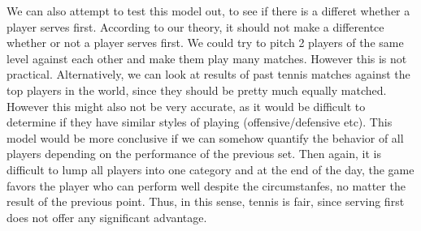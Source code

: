 \documentclass[12pt]{article}
\begin{document}
\vskip0.25in We can also attempt to test this model out, to see if there is a differet whether a player serves first. According to our theory, it should not make a differentce whether or not a player serves first. We could try to pitch 2 players of the same level against each other and make them play many matches. However this is not practical. Alternatively, we can look at results of past tennis matches against the top players in the world, since they should be pretty much equally matched. However this might also not be very accurate, as it would be difficult to determine if they have similar styles of playing (offensive/defensive etc).
\vskip0.25in This model would be more conclusive if we can somehow quantify the behavior of all players depending on the performance of the previous set. Then again, it is difficult to lump all players into one category and at the end of the day, the game favors the player who can perform well despite the circumstanfes, no matter the result of the previous point. Thus, in this sense, tennis is fair, since serving first does not offer any significant advantage. 
\end{document}

